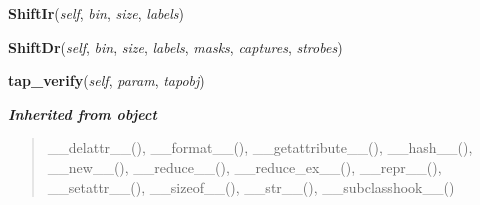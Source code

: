\hspace{.8\funcindent}\begin{boxedminipage}{\funcwidth}

    \raggedright \textbf{ShiftIr}(\textit{self}, \textit{bin}, \textit{size}, \textit{labels})

\setlength{\parskip}{2ex}
\setlength{\parskip}{1ex}
    \end{boxedminipage}

    \label{htd_hpl_itpp_interface:hpl_itpp_interface:ShiftDr}

    \vspace{0.5ex}

\hspace{.8\funcindent}\begin{boxedminipage}{\funcwidth}

    \raggedright \textbf{ShiftDr}(\textit{self}, \textit{bin}, \textit{size}, \textit{labels}, \textit{masks}, \textit{captures}, \textit{strobes})

\setlength{\parskip}{2ex}
\setlength{\parskip}{1ex}
    \end{boxedminipage}

    \label{htd_hpl_itpp_interface:hpl_itpp_interface:tap_verify}

    \vspace{0.5ex}

\hspace{.8\funcindent}\begin{boxedminipage}{\funcwidth}

    \raggedright \textbf{tap\_verify}(\textit{self}, \textit{param}, \textit{tapobj})

\setlength{\parskip}{2ex}
\setlength{\parskip}{1ex}
    \end{boxedminipage}


\large{\textbf{\textit{Inherited from object}}}

\begin{quote}
\_\_delattr\_\_(), \_\_format\_\_(), \_\_getattribute\_\_(), \_\_hash\_\_(), \_\_new\_\_(), \_\_reduce\_\_(), \_\_reduce\_ex\_\_(), \_\_repr\_\_(), \_\_setattr\_\_(), \_\_sizeof\_\_(), \_\_str\_\_(), \_\_subclasshook\_\_()
\end{quote}

